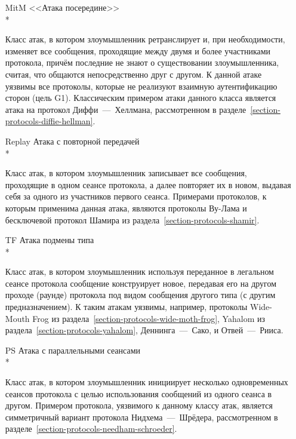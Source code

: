 \begin{itemize}
    \item[MitM] <<Атака посередине>>\\*
    \item[{}] Класс атак, в котором злоумышленник ретранслирует и, при необходимости, изменяет все сообщения, проходящие между двумя и более участниками протокола, причём последние не знают о существовании злоумышленника, считая, что общаются непосредственно друг с другом. К данной атаке уязвимы все протоколы, которые не реализуют взаимную аутентификацию сторон (цель G1). Классическим примером атаки данного класса является атака на протокол Диффи~---~Хеллмана, рассмотренном в разделе~\ref{section-protocols-diffie-hellman}.

    \item[Replay] Атака с повторной передачей\\*
    \item[{}] Класс атак, в котором злоумышленник записывает все сообщения, проходящие в одном сеансе протокола, а далее повторяет их в новом, выдавая себя за одного из участников первого сеанса. Примерами протоколов, к которым применима данная атака, являются протоколы Ву-Лама и бесключевой протокол Шамира из раздела~\ref{section-protocols-shamir}.

    \item[TF] Атака подмены типа\\*
    \item[{}] Класс атак, в котором злоумышленник используя переданное в легальном сеансе протокола сообщение конструирует новое, передавая его на другом проходе (раунде) протокола под видом сообщения другого типа (с другим предназначением). К таким атакам уязвимы, например, протоколы Wide-Mouth Frog из раздела~\ref{section-protocols-wide-moth-frog}, Yahalom из раздела~\ref{section-protocols-yahalom}, Деннинга~---~Сако, и Отвей~---~Рииса.

    \item[PS] Атака с параллельными сеансами\\*
    \item[{}] Класс атак, в котором злоумышленник инициирует несколько одновременных сеансов протокола с целью использования сообщений из одного сеанса в другом. Примером протокола, уязвимого к данному классу атак, является симметричный вариант протокола Нидхема~---~Шрёдера, рассмотренном в разделе~\ref{section-protocols-needham-schroeder}.


\end{itemize}
